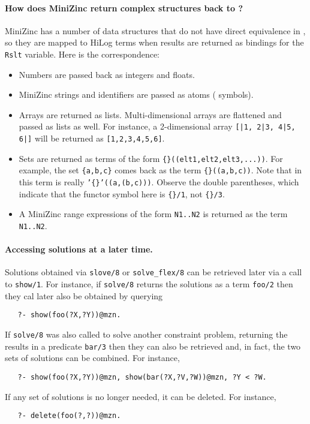 \paragraph{How does MiniZinc return complex structures back to \FLSYSTEM?}
MiniZinc has a number of data structures that do not have direct
equivalence in \FLSYSTEM, so they are mapped to HiLog terms when results are
returned as bindings for the \texttt{Rslt} variable. Here is the correspondence:
\begin{itemize}
\item  Numbers are passed back as integers and floats.
\item  MiniZinc strings and identifiers are passed as atoms (\FLSYSTEM
  symbols).
\item  Arrays are returned as lists. Multi-dimensional arrays are flattened
  and passed as lists as well. For instance, a 2-dimensional array
  \texttt{[|1, 2|3, 4|5, 6|]} will be returned as \texttt{[1,2,3,4,5,6]}.
\item Sets are returned as terms of the form
  \texttt{\{\}((elt1,elt2,elt3,...))}. 
  For example, the set \texttt{\{a,b,c\}} comes back as the term
  \texttt{\{\}((a,b,c))}. Note that in \FLSYSTEM this term is really
  \texttt{'\{\}'((a,(b,c)))}. Observe the double parentheses, which indicate
  that the functor symbol here is \texttt{\{\}/1}, not \texttt{\{\}/3}.
\item A MiniZinc range expressions of the form \texttt{N1..N2} is returned as
  the term \texttt{N1..N2}.
\end{itemize}

\paragraph{Accessing solutions at a later time.}

Solutions obtained via \texttt{slove/8} or \texttt{solve\_flex/8} 
can be retrieved later via a call to \texttt{show/1}.  For instance, if
\texttt{solve/8} returns the solutions as a term \texttt{foo/2} then
they cal later also be obtained by querying
\begin{verbatim}
   ?- show(foo(?X,?Y))@mzn.
\end{verbatim}
If \texttt{solve/8} was also called to solve another constraint problem,
returning the results in a predicate \texttt{bar/3} then they can also be
retrieved and, in fact, the two sets of solutions can be combined. For
instance, 
\begin{verbatim}
   ?- show(foo(?X,?Y))@mzn, show(bar(?X,?V,?W))@mzn, ?Y < ?W.
\end{verbatim}
If any set of solutions is no longer needed, it can be deleted.
For instance,
\begin{verbatim}
   ?- delete(foo(?,?))@mzn.
\end{verbatim}

